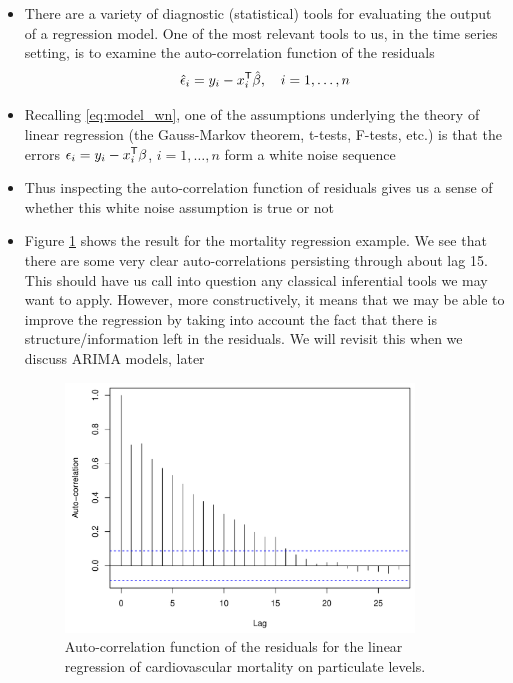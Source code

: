 \documentclass{article}
\begin{document}
\begin{itemize}
\item There are a variety of diagnostic (statistical) tools for evaluating the
  output of a regression model. One of the most relevant tools to us, in the 
  time series setting, is to examine the auto-correlation function of the 
  residuals   
  \[
  \hat\epsilon_i = y_i - x_i^{\mathsf{T}} \hat{\beta}, \quad i = 1,\dots,n
  \]
  
\item Recalling \eqref{eq:model_wn}, one of the assumptions underlying the
  theory of linear regression (the Gauss-Markov theorem, t-tests, F-tests, etc.)
  is that the errors $\epsilon_i = y_i - x_i^{\mathsf{T}} \beta$, $i = 1,\dots,n$ form a 
  white noise sequence  

\item Thus inspecting the auto-correlation function of residuals gives us a
  sense of whether this white noise assumption is true or not

\item Figure \ref{fig:cardio_acf} shows the result for the mortality regression
  example. We see that there are some very clear auto-correlations persisting  
  through about lag 15. This should have us call into question any classical
  inferential tools we may want to apply. However, more constructively, it means
  that we may be able to improve the regression by taking into account the fact
  that there is structure/information left in the residuals. We will revisit
  this when we discuss ARIMA models, later 

\begin{figure}[htb]
\centering
\includegraphics[width=0.875\textwidth]{fig/cardio-mult-3.pdf} 
\caption{Auto-correlation function of the residuals for the linear regression of
  cardiovascular mortality on particulate levels.}
\label{fig:cardio_acf}
\end{figure}


\end{itemize}
\end{document}
